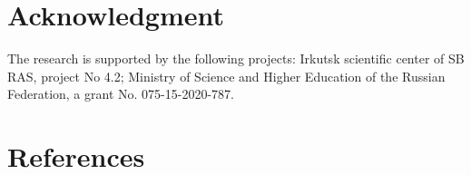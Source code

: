 \documentclass[a4paper]{jpconf}
\begin{document}
\section*{Acknowledgment}
The research is supported by the following projects: Irkutsk scientific center of SB RAS, project No 4.2; Ministry of Science and Higher Education of the Russian
Federation, a grant No. 075-15-2020-787.








\section*{References}
\end{document}
